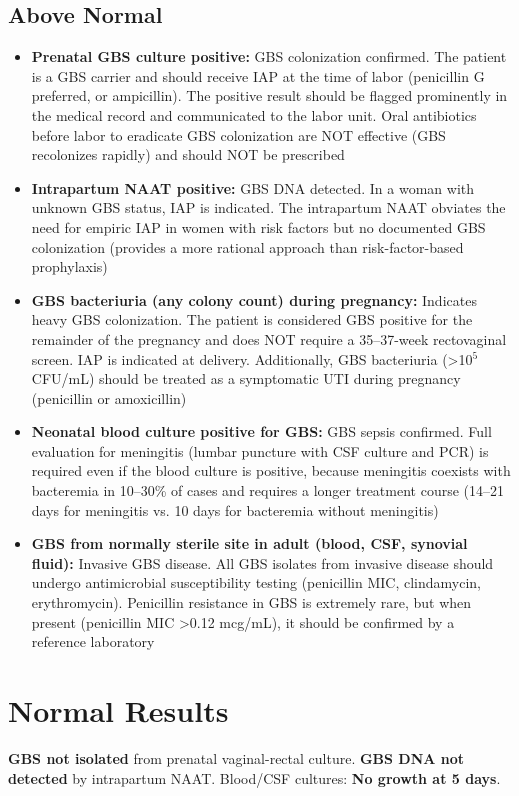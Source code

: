 \subsection*{Above Normal}
\begin{itemize}
  \item \textbf{Prenatal GBS culture positive:} GBS colonization confirmed. The patient is a GBS carrier and should receive IAP at the time of labor (penicillin G preferred, or ampicillin). The positive result should be flagged prominently in the medical record and communicated to the labor unit. Oral antibiotics before labor to eradicate GBS colonization are NOT effective (GBS recolonizes rapidly) and should NOT be prescribed
  \item \textbf{Intrapartum NAAT positive:} GBS DNA detected. In a woman with unknown GBS status, IAP is indicated. The intrapartum NAAT obviates the need for empiric IAP in women with risk factors but no documented GBS colonization (provides a more rational approach than risk-factor-based prophylaxis)
  \item \textbf{GBS bacteriuria (any colony count) during pregnancy:} Indicates heavy GBS colonization. The patient is considered GBS positive for the remainder of the pregnancy and does NOT require a 35--37-week rectovaginal screen. IAP is indicated at delivery. Additionally, GBS bacteriuria (>10$^5$ CFU/mL) should be treated as a symptomatic UTI during pregnancy (penicillin or amoxicillin)
  \item \textbf{Neonatal blood culture positive for GBS:} GBS sepsis confirmed. Full evaluation for meningitis (lumbar puncture with CSF culture and PCR) is required even if the blood culture is positive, because meningitis coexists with bacteremia in 10--30\% of cases and requires a longer treatment course (14--21 days for meningitis vs. 10 days for bacteremia without meningitis)
  \item \textbf{GBS from normally sterile site in adult (blood, CSF, synovial fluid):} Invasive GBS disease. All GBS isolates from invasive disease should undergo antimicrobial susceptibility testing (penicillin MIC, clindamycin, erythromycin). Penicillin resistance in GBS is extremely rare, but when present (penicillin MIC >0.12 mcg/mL), it should be confirmed by a reference laboratory
\end{itemize}

\section*{Normal Results}
\textbf{GBS not isolated} from prenatal vaginal-rectal culture. \textbf{GBS DNA not detected} by intrapartum NAAT. Blood/CSF cultures: \textbf{No growth at 5 days}.

